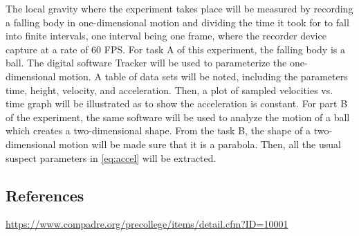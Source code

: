 \documentclass[a4paper, 12pt]{article}
\newcommand{\subhead}[1]{\subsection{\normalsize #1}}
\begin{document}
    The local gravity where the experiment takes place will be measured by 
    recording a falling body in one-dimensional motion and dividing the time it took 
    for to fall into finite intervals, one interval being one frame, where the recorder 
    device capture at a rate of 60 FPS. For task A of this experiment, the falling body 
    is a ball. The digital software Tracker will be used to parameterize the one-dimensional 
    motion. A table of data sets will be noted, including the parameters 
    time, height, velocity, and acceleration. Then, a plot of sampled velocities vs. time
    graph will be illustrated as to show the acceleration is constant. For part B of the 
    experiment, the same software will be used to analyze the motion of a ball which 
    creates a two-dimensional shape. From the task B, the shape of a two-dimensional
    motion will be made sure that it is a parabola. Then, all the usual suspect 
    parameters in \cref{eq:accel} will be extracted.

    \subhead{References}
    \url{https://www.compadre.org/precollege/items/detail.cfm?ID=10001}

    \clearpage
\end{document}
